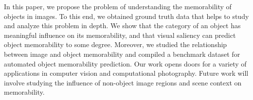 In this paper, we propose the problem of understanding the memorability of objects in images. To this end, we obtained ground truth data that helps to study and analyze this problem in depth. We show that the category of an object has meaningful influence on its memorability, and that visual saliency can predict object memorability to some degree. Moreover, we studied the relationship between image and object memorability and compiled a benchmark dataset for automated object memorability prediction. Our work opens doors for a variety of applications in computer vision and computational photography. Future work will involve studying the influence of non-object image regions and scene context on memorability.
